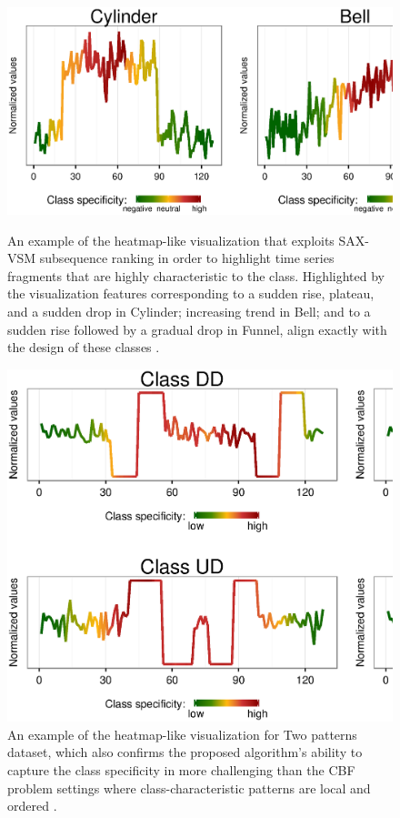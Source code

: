 \begin{figure}[!h]
   \centering
   \includegraphics[width=130mm]{figures/cbf-heatmap.ps}
   \caption{An example of the heatmap-like visualization that exploits SAX-VSM subsequence ranking in order to 
   highlight time series fragments that are highly characteristic to the class.
   Highlighted by the visualization features corresponding to a sudden rise, plateau, and a sudden drop in Cylinder; 
   increasing trend in Bell;
   and to a sudden rise followed by a gradual drop in Funnel, 
   align exactly with the design of these classes \cite{citeulike:12563781}.}
   \label{fig:heat1}
   \includegraphics[width=130mm]{figures/2patterns-heatmap.ps}
   \caption{An example of the heatmap-like visualization for Two patterns dataset, which also confirms the proposed 
   algorithm's ability to capture the class specificity in more challenging than the CBF problem settings where class-characteristic 
   patterns are local and ordered \cite{two_patterns}.}
   \label{fig:heat2}
\end{figure}

